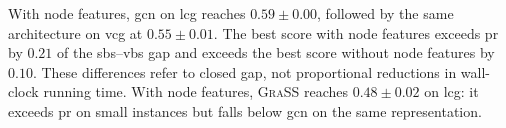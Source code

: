 \begin{table}[htbp]
\end{table}
With node features, \gls{gcn} on \gls{lcg} reaches $0.59\pm0.00$, followed by the same architecture on \gls{vcg} at $0.55\pm0.01$. The best score with node features exceeds \gls{pr} by $0.21$ of the \gls{sbs}--\gls{vbs} gap and exceeds the best score without node features by $0.10$. These differences refer to closed gap, not proportional reductions in wall-clock running time. With node features, \textsc{GraSS} reaches $0.48\pm0.02$ on \gls{lcg}: it exceeds \gls{pr} on small instances but falls below \gls{gcn} on the same representation.

